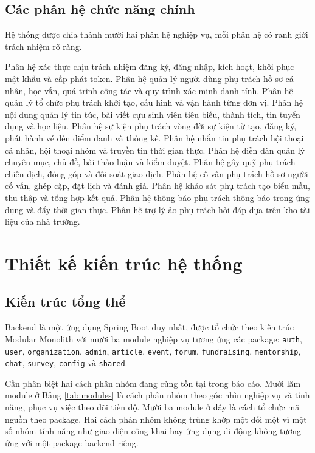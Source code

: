 \documentclass[12pt,a4paper,oneside]{report}
\begin{document}
\subsection{Các phân hệ chức năng chính}

Hệ thống được chia thành mười hai phân hệ nghiệp vụ, mỗi phân hệ có ranh giới trách nhiệm rõ ràng.

Phân hệ xác thực chịu trách nhiệm đăng ký, đăng nhập, kích hoạt, khôi phục mật khẩu và cấp phát token. Phân hệ quản lý người dùng phụ trách hồ sơ cá nhân, học vấn, quá trình công tác và quy trình xác minh danh tính. Phân hệ quản lý tổ chức phụ trách khởi tạo, cấu hình và vận hành từng đơn vị. Phân hệ nội dung quản lý tin tức, bài viết cựu sinh viên tiêu biểu, thành tích, tin tuyển dụng và học liệu. Phân hệ sự kiện phụ trách vòng đời sự kiện từ tạo, đăng ký, phát hành vé đến điểm danh và thống kê. Phân hệ nhắn tin phụ trách hội thoại cá nhân, hội thoại nhóm và truyền tin thời gian thực. Phân hệ diễn đàn quản lý chuyên mục, chủ đề, bài thảo luận và kiểm duyệt. Phân hệ gây quỹ phụ trách chiến dịch, đóng góp và đối soát giao dịch. Phân hệ cố vấn phụ trách hồ sơ người cố vấn, ghép cặp, đặt lịch và đánh giá. Phân hệ khảo sát phụ trách tạo biểu mẫu, thu thập và tổng hợp kết quả. Phân hệ thông báo phụ trách thông báo trong ứng dụng và đẩy thời gian thực. Phân hệ trợ lý ảo phụ trách hỏi đáp dựa trên kho tài liệu của nhà trường.

\section{Thiết kế kiến trúc hệ thống}

\subsection{Kiến trúc tổng thể}

Backend là một ứng dụng Spring Boot duy nhất, được tổ chức theo kiến trúc Modular Monolith với mười ba module nghiệp vụ tương ứng các package: \texttt{auth}, \texttt{user}, \texttt{organization}, \texttt{admin}, \texttt{article}, \texttt{event}, \texttt{forum}, \texttt{fundraising}, \texttt{mentorship}, \texttt{chat}, \texttt{survey}, \texttt{config} và \texttt{shared}.

Cần phân biệt hai cách phân nhóm đang cùng tồn tại trong báo cáo. Mười lăm module ở Bảng \ref{tab:modules} là cách phân nhóm theo góc nhìn nghiệp vụ và tính năng, phục vụ việc theo dõi tiến độ. Mười ba module ở đây là cách tổ chức mã nguồn theo package. Hai cách phân nhóm không trùng khớp một đối một vì một số nhóm tính năng như giao diện công khai hay ứng dụng di động không tương ứng với một package backend riêng.
\end{document}

